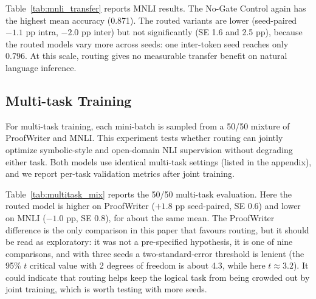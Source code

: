 \documentclass[10pt,twocolumn,letterpaper]{article}
\begin{document}
Table~\ref{tab:mnli_transfer} reports MNLI results. The No-Gate Control again
has the highest mean accuracy (0.871). The routed variants are lower
(seed-paired $-1.1$ pp intra, $-2.0$ pp inter) but not significantly
(SE 1.6 and 2.5 pp), because the routed models vary more across seeds: one
inter-token seed reaches only 0.796. At this
scale, routing gives no measurable transfer benefit on natural language
inference.

\subsection{Multi-task Training}
For multi-task training, each mini-batch is sampled from a 50/50 mixture of
ProofWriter and MNLI. This experiment tests whether routing can jointly
optimize symbolic-style and open-domain NLI supervision without degrading
either task. Both models use identical multi-task settings (listed in the
appendix), and we report per-task validation metrics after joint training.

\begin{table}[htbp]
\centering
{}
\caption{50/50 mixed ProofWriter (with rulebase) and MNLI training, mean $\pm$
SD over 3 seeds.}
\label{tab:multitask_mix}
\end{table}

Table~\ref{tab:multitask_mix} reports the 50/50 multi-task evaluation. Here
the routed model is higher on ProofWriter ($+1.8$ pp seed-paired, SE 0.6) and
lower on MNLI ($-1.0$ pp, SE 0.8), for about the same mean. The ProofWriter
difference is the only comparison in this paper that favours routing, but it
should be read as exploratory: it was not a pre-specified hypothesis, it is one
of nine comparisons, and with three seeds a two-standard-error threshold is
lenient (the 95\% $t$ critical value with 2 degrees of freedom is about 4.3,
while here $t \approx 3.2$). It could indicate that routing helps keep the logical
task from being crowded out by joint training, which is worth testing with
more seeds.
\end{document}
